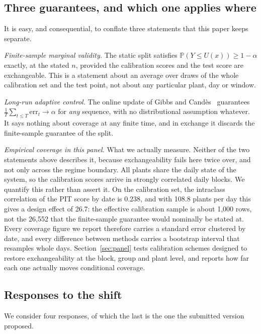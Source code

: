 \documentclass[preprint,3p,times]{elsarticle}
\begin{document}
\subsection{Three guarantees, and which one applies where}
\label{sec:guarantees}

It is easy, and consequential, to conflate three statements that this paper keeps separate.

\emph{Finite-sample marginal validity.} The static split satisfies $\mathbb{P}(Y\le U(x))\ge 1-\alpha$ exactly, at the stated $n$, provided the calibration scores and the test score are exchangeable. This is a statement about an average over draws of the whole calibration set and the test point, not about any particular plant, day or window.

\emph{Long-run adaptive control.} The online update of Gibbs and Cand\`es~\cite{gibbs2021} guarantees $\frac1T\sum_{t\le T}\mathrm{err}_t\to\alpha$ for \emph{any} sequence, with no distributional assumption whatever. It says nothing about coverage at any finite time, and in exchange it discards the finite-sample guarantee of the split.

\emph{Empirical coverage in this panel.} What we actually measure. Neither of the two statements above describes it, because exchangeability fails here twice over, and not only across the regime boundary. All plants share the daily state of the system, so the calibration scores arrive in strongly correlated daily blocks. We quantify this rather than assert it. On the calibration set, the intraclass correlation of the PIT score by date is 0.238, and with 108.8 plants per day this gives a design effect of 26.7: the effective calibration sample is about 1{,}000 rows, not the 26{,}552 that the finite-sample guarantee would nominally be stated at. Every coverage figure we report therefore carries a standard error clustered by date, and every difference between methods carries a bootstrap interval that resamples whole days. Section~\ref{sec:panel} tests calibration schemes designed to restore exchangeability at the block, group and plant level, and reports how far each one actually moves conditional coverage.

\subsection{Responses to the shift}
\label{sec:respuestas}

We consider four responses, of which the last is the one the submitted version proposed.
\end{document}
